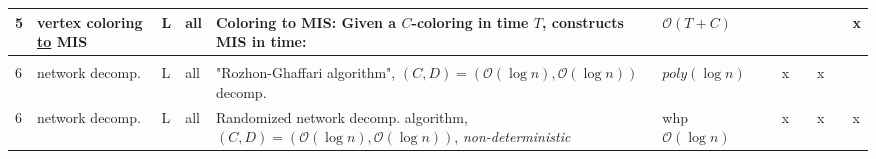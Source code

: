 \documentclass{article}
\begin{document}
\begin{table}
\begin{tabular}{@{}p{3mm}|p{30mm}|p{2mm}|p{13mm}|p{117mm}|p{30mm}|p{25mm}|p{2mm}|p{2mm}|p{2mm}|p{2mm}|p{3mm}}
	5 & vertex coloring \underline{to} MIS & L & all & Coloring to MIS: Given a $C$-coloring in time $T$, constructs MIS in time: & $\mathcal{O}(T+C)$ &  &  &  &  &  & x \\ 
	\hline 
	
	&  &  &  &  &  &  &  &  &  &  &  \\ 
	\hline 
	
	6 & network decomp. & L & all & "Rozhon-Ghaffari algorithm", $(C,D) = (\mathcal{O}(\log n), \mathcal{O}(\log n))$ decomp. & $poly(\log n)$ &  & x &  & x &  &  \\ 
	\hline
	
	6 & network decomp. & L & all & Randomized network decomp. algorithm, $(C,D) = (\mathcal{O}(\log n), \mathcal{O}(\log n))$, \textit{non-deterministic} & whp $\mathcal{O}(\log n)$ &  & x &  & x &  & x \\ 
	\hline
	
\end{tabular} 
\end{table}
\end{document}
